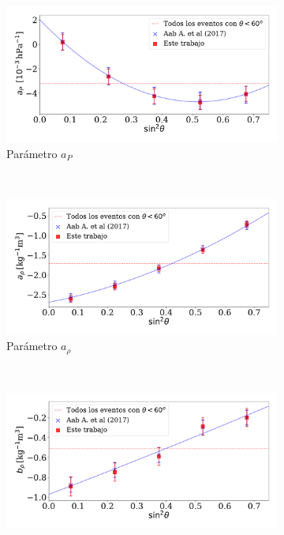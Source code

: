                 \begin{figure}[H]
                    \centering
                    \begin{subfigure}[b]{0.75\textwidth}
                    \includegraphics[width=\linewidth]{Graphs/params/ap_ICRC_2015_above_1EeV_v2.pdf}
                    \caption{Parámetro $a_P$ }
                    \label{fig:ap_2017}
                    \end{subfigure}\\
                    \begin{subfigure}[b]{0.75\textwidth}
                    \includegraphics[width=\linewidth]{Graphs/params/arho_ICRC_2015_above_1EeV_v2.pdf}
                    \caption{Parámetro $a_{\rho}$ }
                    \label{fig:arho_2017}
                    \end{subfigure}\\
                    \begin{subfigure}[b]{\textwidth}
                    \centering
                    \includegraphics[width=0.75\linewidth]{Graphs/params/brho_ICRC_2015_above_1EeV_v2.pdf}

\end{subfigure}
\end{figure}
